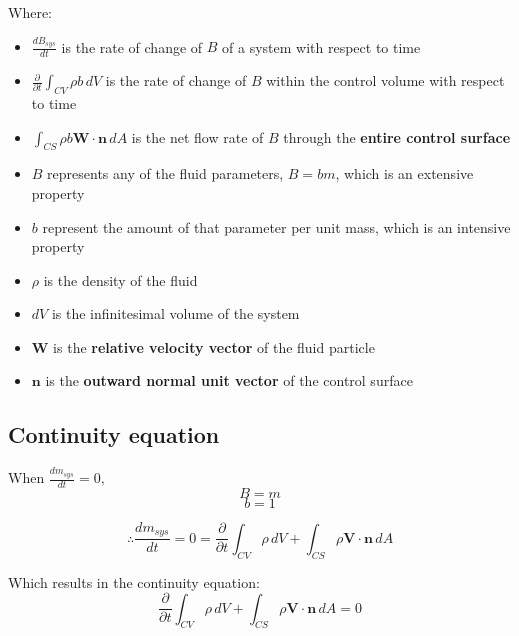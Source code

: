 \documentclass[11pt]{article}
\begin{document}
Where:
\begin{itemize}
\item \(\frac{dB_{sys}}{dt}\) is the rate of change of \(B\) of a system with respect to time
\item \(\frac{\partial}{\partial t} \int_{CV} \rho b \, dV\) is the rate of change of \(B\) within the control volume with respect to time
\item \(\int_{CS} \rho b \boldsymbol{W} \cdot \boldsymbol{n} \, dA\) is the net flow rate of \(B\) through the \textbf{entire control surface}
\item \(B\) represents any of the fluid parameters, \(B = bm\), which is an extensive property
\item \(b\) represent the amount of that parameter per unit mass, which is an intensive property
\item \(\rho\) is the density of the fluid
\item \(dV\) is the infinitesimal volume of the system
\item \(\boldsymbol{W}\) is the \textbf{relative velocity vector} of the fluid particle
\item \(\boldsymbol{n}\) is the \textbf{outward normal unit vector} of the control surface
\end{itemize}

\newpage

\subsection{Continuity equation}
\label{sec:org64aecd9}
When \(\frac{dm_{sys}}{dt} = 0\),
\[B = m\]
\[b = 1\]

\[\therefore \frac{dm_{sys}}{dt} = 0 = \frac{\partial}{\partial t} \int_{CV} \rho \, dV + \int_{CS} \rho \boldsymbol{V} \cdot \boldsymbol{n} \, dA\]

Which results in the continuity equation:
\[\frac{\partial}{\partial t} \int_{CV} \rho \, dV + \int_{CS} \rho \boldsymbol{V} \cdot \boldsymbol{n} \, dA = 0\]
\end{document}
